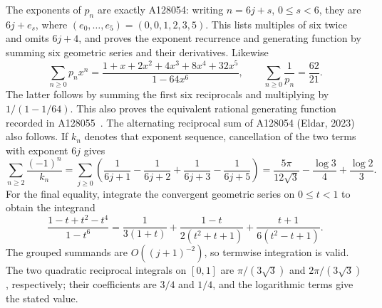 \documentclass[11pt]{article}
\begin{document}
The exponents of $p_n$ are exactly A128054: writing $n=6j+s$,
$0\leq s<6$, they are $6j+e_s$, where
$(e_0,\ldots,e_5)=(0,0,1,2,3,5)$.
This lists multiples of six twice and omits $6j+4$, and proves
the exponent recurrence and generating function by summing six geometric
series and their derivatives. Likewise
\[
 \sum_{n\geq0}p_nx^n=\frac{1+x+2x^2+4x^3+8x^4+32x^5}{1-64x^6},
 \qquad \sum_{n\geq0}\frac1{p_n}=\frac{62}{21}.
\]
The latter follows by summing the first six reciprocals and multiplying
by $1/(1-1/64)$. This also proves the equivalent rational generating
function recorded in A128055~\cite{a128055,a128054}.
The alternating reciprocal sum of A128054 (Eldar, 2023) also follows.
If $k_n$ denotes that exponent sequence, cancellation of the two terms
with exponent $6j$ gives
\[
 \sum_{n\geq2}\frac{(-1)^n}{k_n}
 =\sum_{j\geq0}\left(\frac1{6j+1}-\frac1{6j+2}
                  +\frac1{6j+3}-\frac1{6j+5}\right)
 =\frac{5\pi}{12\sqrt3}-\frac{\log3}4+\frac{\log2}3.
\]
For the final equality, integrate the convergent geometric series on
$0\leq t<1$ to obtain the integrand
\[
 \frac{1-t+t^2-t^4}{1-t^6}
 =\frac1{3(1+t)}+\frac{1-t}{2(t^2+t+1)}
                   +\frac{t+1}{6(t^2-t+1)}.
\]
The grouped summands are $O((j+1)^{-2})$, so termwise integration is
valid. The two quadratic reciprocal integrals on $[0,1]$ are
$\pi/(3\sqrt3)$ and $2\pi/(3\sqrt3)$, respectively; their coefficients
are $3/4$ and $1/4$, and the logarithmic terms give the stated value.
\end{document}
